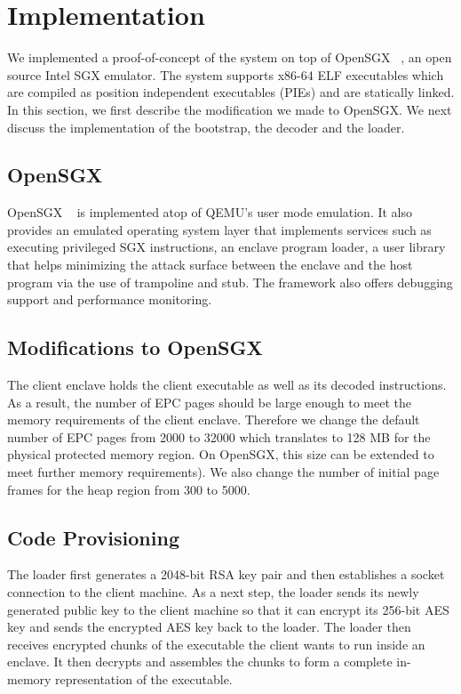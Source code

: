 \section{Implementation}

We implemented a proof-of-concept of the system on top of OpenSGX ~\cite{OpenSGX}, an open source Intel SGX emulator. The system supports x86-64 ELF executables which are compiled as position independent executables (PIEs) and are statically linked.  
In this section, we first describe the modification we made to OpenSGX. We next discuss the implementation of the bootstrap, the decoder and the loader. 

\subsection{OpenSGX}
OpenSGX ~\cite{OpenSGX} is implemented atop of QEMU's user mode emulation. It also provides an emulated operating system layer that implements services such as executing privileged SGX instructions, an enclave program loader, a user library that helps minimizing the attack surface between the enclave and the host program via the use of trampoline and stub. The framework also offers debugging support and performance monitoring.

\subsection{Modifications to OpenSGX}
The client enclave holds the client executable as well as its decoded instructions. As a result, the number of EPC pages should 
be large enough to meet the memory requirements of the client enclave. Therefore we change the default number of EPC pages from 
2000 to 32000 which translates to 128 MB for the physical protected memory region. On OpenSGX, this size can be extended 
to meet further memory requirements). We also change the number of initial page frames for the heap region from 300 to 5000.

\subsection{Code Provisioning}
The loader first generates a 2048-bit RSA key pair and then establishes a socket connection to the client machine. As a next step, 
the loader sends its newly generated public key to the client machine so that it can encrypt its 256-bit AES key and sends the encrypted 
AES key back to the loader. The loader then receives encrypted chunks of the executable the client wants to run inside an enclave. It then
decrypts and assembles the chunks to form a complete in-memory representation of the executable. 

